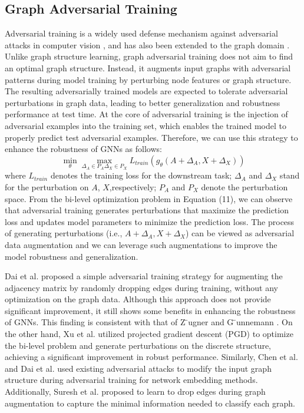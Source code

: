\documentclass[acmsmall,natbib=false]{acmart}
\begin{document}
\subsection{Graph Adversarial Training}
Adversarial training is a widely used defense mechanism against adversarial attacks in computer vision \cite{31}, and has also been extended to the graph domain \cite{10, 17, 18, 20, 25, 41, 57}. Unlike graph structure learning, graph adversarial training does not aim to find an optimal graph structure. Instead, it augments input graphs with adversarial patterns during model training by perturbing node features or graph structure. The resulting adversarially trained models are expected to tolerate adversarial perturbations in graph data, leading to better generalization and robustness performance at test time. At the core of adversarial training is the injection of adversarial examples into the training set, which enables the trained model to properly predict test adversarial examples. Therefore, we can use this strategy to enhance the robustness of GNNs as follows:
\begin{equation}
  \min_{\theta} \max_{\Delta_A \in P_A \Delta_X \in P_X} L_{train}(g_{\theta}(A+\Delta_A,X+\Delta_X))
\end{equation}
where $L_{train}$ denotes the training loss for the downstream task; $\Delta_A$ and $\Delta_X$ stand for the perturbation on $A$, $X$,respectively; $P_A$ and $P_X$ denote the perturbation space. From the bi-level optimization problem in Equation (11), we can observe that adversarial training generates perturbations that maximize the prediction loss and updates model parameters to minimize the prediction loss. The process of generating perturbations (i.e., $A+\Delta_A,X+\Delta_X$) can be viewed as adversarial data augmentation and we can leverage such augmentations to improve the model robustness and generalization.

Dai et al. \cite{17} proposed a simple adversarial training strategy for augmenting the adjacency matrix by randomly dropping edges during training, without any optimization on the graph data. Although this approach does not provide significant improvement, it still shows some benefits in enhancing the robustness of GNNs. This finding is consistent with that of Z ̈ugner and G ̈unnemann \cite{146}. On the other hand, Xu et al. \cite{116} utilized projected gradient descent (PGD) to optimize the bi-level problem and generate perturbations on the discrete structure, achieving a significant improvement in robust performance. Similarly, Chen et al. \cite{9} and Dai et al. \cite{18} used existing adversarial attacks to modify the input graph structure during adversarial training for network embedding methods. Additionally, Suresh et al. \cite{92} proposed to learn to drop edges during graph augmentation to capture the minimal information needed to classify each graph.
\end{document}

